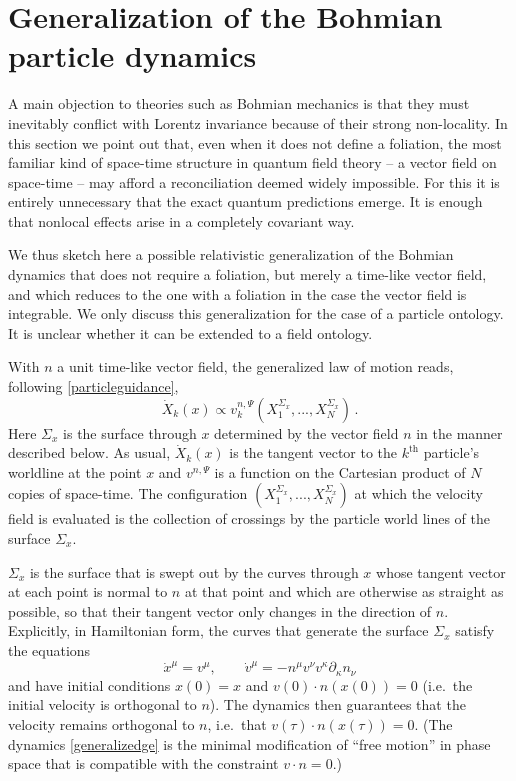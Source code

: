 \documentclass[12pt]{article}
\begin{document}
\section{Generalization of the Bohmian particle dynamics}
\label{sec5}

A main objection to theories such as Bohmian mechanics is that they must inevitably conflict with Lorentz invariance because of their strong non-locality. In this section we  point out that, even when it does not define a foliation, the most familiar kind of space-time structure in quantum field theory -- a vector field on space-time -- may afford a reconciliation deemed widely impossible. For this it is entirely unnecessary that the exact quantum predictions emerge. It is enough that nonlocal effects arise in a completely covariant way.

We thus sketch here a possible relativistic generalization of the Bohmian dynamics that does not require a foliation, but merely a time-like vector field, and which reduces to the one with a foliation in the case the vector field is integrable. We only discuss this generalization for the case of a particle ontology. It is unclear whether it can be extended to a field ontology.

With $n$ a unit time-like vector field, the generalized law of motion reads, following \eqref{particleguidance},
\begin{equation} 
{\dot X}_k(x) \propto  v^{n, \Psi{}}_k (X_1^{\Sigma_x}, ... , X_N^{\Sigma_x})\,.
\end{equation}
Here $\Sigma_x$ is the surface through $x$ determined by the vector field $n$ in the manner described below. As usual, ${\dot X}_k(x)$ is the tangent vector to the $k^{\textrm{th}}$ particle's worldline at the point $x$ and $v^{n,\Psi}$ is a function on the Cartesian product of $N$ copies of space-time. The configuration $(X_1^{\Sigma_x}, ... , X_N^{\Sigma_x})$ at which the velocity field is evaluated is the collection of crossings by the particle world lines of the surface $\Sigma_x$. 

$\Sigma_x$ is the surface that is swept out by the curves through $x$ whose tangent vector at each point is normal to $n$ at that point and which are otherwise as straight as possible, so that their tangent vector only changes in the direction of $n$. Explicitly, in Hamiltonian form, the curves that generate the surface $\Sigma_x$ satisfy the equations
\begin{equation} 
\dot{x}^\mu = v^\mu , \qquad {\dot v}^\mu = - n^\mu v^\nu  v^\kappa \partial_\kappa n_\nu
\label{generalizedge}
\end{equation}
and have initial conditions $x(0)=x$ and $v(0) \cdot n(x(0))=0$ (i.e.\ the initial velocity is orthogonal to $n$). The dynamics then guarantees that the velocity remains orthogonal to $n$, i.e.\ that $v(\tau) \cdot n(x(\tau))=0$. (The dynamics \eqref{generalizedge} is the minimal modification of ``free motion'' in phase space that is compatible with the constraint $v \cdot n =0$.)
\end{document}
